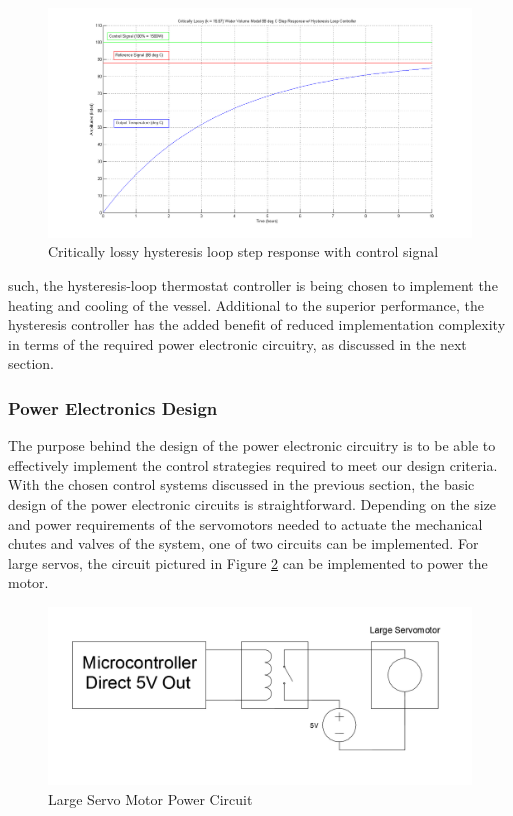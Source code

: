 \documentclass{article}
\begin{document}
\begin{figure}[H]
\begin{center}
\includegraphics[scale=0.30]{hysteresis-step-critical.png}
\caption{Critically lossy hysteresis loop step response with control signal}
\label{fig:hysteresis-step-critical}
\end{center}
\end{figure}

 such, the hysteresis-loop thermostat controller is being chosen to implement the heating and cooling of the vessel. Additional to the superior performance, the hysteresis controller has the added benefit of reduced implementation complexity in terms of the required power electronic circuitry, as discussed in the next section.

\subsubsection{Power Electronics Design}
The purpose behind the design of the power electronic circuitry is to be able to effectively implement the control strategies required to meet our design criteria. With the chosen control systems discussed in the previous section, the basic design of the power electronic circuits is straightforward. Depending on the size and power requirements of the servomotors needed to actuate the mechanical chutes and valves of the system, one of two circuits can be implemented. For large servos, the circuit pictured in Figure \ref{fig:servo-large-actuator-circuit} can be implemented to power the motor.

\begin{figure}[H]
\begin{center}
\includegraphics[scale=0.20]{servo-large-actuator-circuit.png}
\caption{Large Servo Motor Power Circuit}
\label{fig:servo-large-actuator-circuit}
\end{center}
\end{figure}
\end{document}
